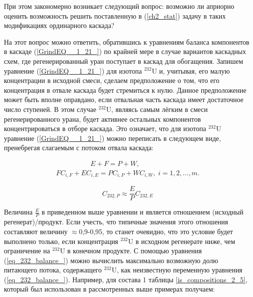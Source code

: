 При этом закономерно возникает следующий вопрос: возможно ли априорно оценить возможность решить поставленную в (\ref{ch2_stat}) задачу в таких модификациях ординарного каскада? 

На этот вопрос можно ответить, обратившись к уравнениям баланса компонентов в каскаде (\ref{GrindEQ__1_21_}) по крайней мере в случае вариантов каскадных схем, где регенерированный уран поступает в каскад для обогащения. Запишем уравнение (\ref{GrindEQ__1_21_}) для изотопа $^{232}$U и, учитывая, его малую концентрации в исходной смеси, сделаем предположение о том, что его концентрация в отвале каскада будет стремиться к нулю. Данное предположение может быть вполне оправдано, если отвальная часть каскада имеет достаточное число ступеней. В этом случае $^{232}$U, являясь самым лёгким в смеси регенерированного урана, будет активнее остальных компонентов концентрироваться в отборе каскада. Это означает, что для изотопа $^{232}$U уравнение (\ref{GrindEQ__1_21_}) можно переписать в следующем виде, пренебрегая слагаемым с потоком отвала каскада:

\begin{equation} \label{GrindEQ__1_21__} 
  \begin{array}{l} {\quad \quad \quad \quad \quad  E+F=P+W,} \\ {FC_{i,F} + EC_{i,E} =PC_{i,P} +WC_{i,W} ,\;  i=1,2,...,m.} \end{array} 
\end{equation} 


\begin{equation}
  \label{eq_232_balance_}
    C_{232,P} \approx \frac{E}{P} C_{232,E}
  \end{equation}

Величина $\frac{E}{P}$ в приведенном выше уравнении и является отношением (исходный регенерат)/продукт. Если учесть, что типичные значения этого отношения составляют величину $\approx$0,9-0,95, то станет очевидно, что это условие будет выполнено только, если концентрация $^{232}$U в исходном регенерате ниже, чем ограничение на $^{232}$U в конечном продукте. 
С помощью уравнения (\ref{eq_232_balance_}) можно вычислить максимально возможную долю питающего потока, содержащего $^{232}$U, как неизвестную переменную уравнения (\ref{eq_232_balance_}). Например, для состава 1 таблицы \ref{is_compositions_2_5}, который был использован в рассмотренных выше примерах получаем:

